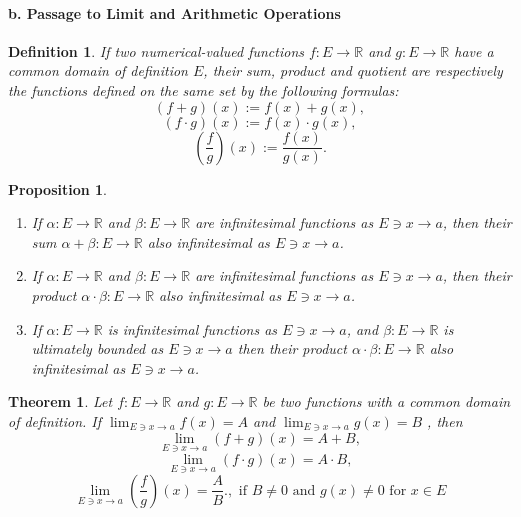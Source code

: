 \documentclass[a4paper,12pt]{article} %
\newtheorem{definition}{Definition}[section]
\newtheorem{theorem}{Theorem}[section]
\newtheorem{proposition}{Proposition}[section]
\begin{document}
\paragraph{{\rm \textbf{b. Passage to Limit and Arithmetic Operations}}}
\begin{definition}
    If two numerical-valued functions $f: E \to \mathbb{R}$ and $g: E \to \mathbb{R}$ 
    have a common domain of definition $E$, their sum, product and quotient 
    are respectively the functions defined on the same set by the 
    following formulas:
    \[
        \left(f+g\right)(x) := f(x) + g(x),
        \]
    \[
        \left(f\cdot g\right)(x) := f(x)\cdot g(x),
        \]
    \[
        \left(\frac{f}{g}\right)(x) := \frac{f(x)}{g(x)}.
        \]
\end{definition}

\begin{proposition}
    \begin{enumerate}
        \item If $\displaystyle \alpha: E \to \mathbb{R}$ and $\displaystyle 
            \beta: E \to \mathbb{R}$ are infinitesimal functions as 
            $\displaystyle E \ni x \to a$, then their sum $\alpha + 
            \beta: E \to \mathbb{R}$ also infinitesimal as $E \ni x \to a$.

        \item If $\displaystyle \alpha: E \to \mathbb{R}$ and $\displaystyle 
            \beta: E \to \mathbb{R}$ are infinitesimal functions as 
            $\displaystyle E \ni x \to a$, then their product $\alpha \cdot 
            \beta: E \to \mathbb{R}$ also infinitesimal as $E \ni x \to a$.
        \item If $\displaystyle \alpha: E \to \mathbb{R}$ is infinitesimal functions as 
            $\displaystyle E \ni x \to a$, and $\displaystyle 
            \beta: E \to \mathbb{R}$ is ultimately bounded as $\displaystyle 
            E \ni x \to a$ then their product $\alpha \cdot 
            \beta: E \to \mathbb{R}$ also infinitesimal as $E \ni x \to a$.
    \end{enumerate}
\end{proposition}

\begin{theorem}
    Let $\displaystyle f: E \to \mathbb{R}$ and $g: E \to \mathbb{R}$
    be two functions with a common domain of definition.
    If $\displaystyle \lim_{E \ni x \to a}f(x) = A$  and 
       $\displaystyle \lim_{E \ni x \to a}g(x) = B$ , then 
    \[
        \lim_{E \ni x \to a}\left(f+g\right)(x) = A + B,
        \]
    \[
        \lim_{E \ni x \to a}\left(f\cdot g\right)(x) = A\cdot B,
        \]
    \[
        \lim_{E \ni x \to a}\left(\frac{f}{g}\right)(x) = \frac{A}{B}.
        , \mbox{ if } B \ne 0 \mbox{ and } g(x) \ne 0 \mbox{ for } 
        x \in E
        \]
\end{theorem}
\end{document}

